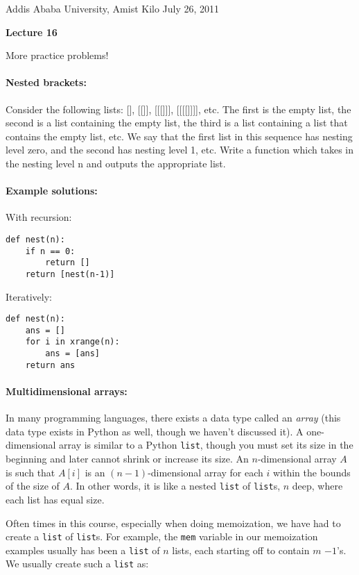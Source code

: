 \documentclass[11pt]{article}
\newlength{\toppush}
\newcommand{\htitle}[2]{\noindent\vspace*{-\toppush}\newline\parbox{6.5in}
 {\large Addis Ababa University, Amist Kilo \hfill #1\newline
\hspace*{\fill}{\bf Algorithms and Programming for High Schoolers} \hspace*{\fill} \newline
\mbox{}\hrulefill\mbox{}}\vspace*{1ex}\mbox{}\newline
\begin{center}{\Large\bf #2}\end{center}}
\begin{document}
\htitle{July 26, 2011}{Lecture 16}

More practice problems!

\paragraph{Nested brackets:}
Consider the following lists: [], [[]], [[[]]], [[[[]]]], etc.  The
first is the empty list, the second is a list containing the empty
list, the third is a list containing a list that contains the empty
list, etc.  We say that the first list in this sequence has nesting
level zero, and the second has nesting level 1, etc.  Write a function
which takes in the nesting level n and outputs the appropriate list.

\paragraph{Example solutions:}
With recursion:

\begin{verbatim}
def nest(n):
    if n == 0:
        return []
    return [nest(n-1)]
\end{verbatim}

Iteratively:

\begin{verbatim}
def nest(n):
    ans = []
    for i in xrange(n):
        ans = [ans]
    return ans
\end{verbatim}

\paragraph{Multidimensional arrays:}
In many programming languages, there exists a data type called
an {\em array} (this data type exists in Python as well, though we
haven't discussed it). A one-dimensional array is similar to a Python
\texttt{list}, though you must set its size in the beginning and later cannot
shrink or increase its size.  An $n$-dimensional array $A$ is such
that $A[i]$ is an $(n-1)$-dimensional array for each $i$ within the
bounds of the size of $A$.  In other words, it is like a nested
\texttt{list} of \texttt{list}s, $n$ deep, where each list has equal
size.

Often times in this course, especially when doing memoization, we have
had to create a \texttt{list} of \texttt{list}s.  For example, the
\texttt{mem} variable in our memoization examples usually has been a
\texttt{list} of $n$ lists, each starting off to contain $m$ $-1$'s.
We usually create such a \texttt{list} as:
\end{document}
